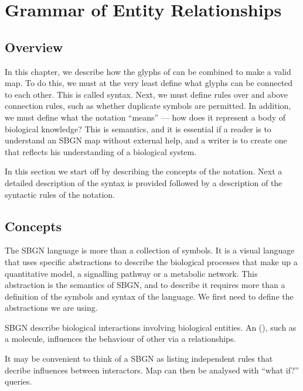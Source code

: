 \chapter{Grammar of Entity Relationships}
\label{chp:grammar}

\section{Overview}

In this chapter, we describe how the glyphs of \SBGNERLone can be combined
to make a valid \ER{} map. To do this, we must at the very least
define what glyphs can be connected to each other. This is called
syntax. Next, we must define rules over and above connection rules,
such as whether duplicate symbols are permitted. In addition, we must define what the notation ``means'' --- how does it represent a body of biological knowledge? This is semantics, and it is essential if a reader is to understand an SBGN map without external help, and a writer is to create one that reflects his understanding of a biological system.

In this section we start off by describing the concepts of the
\ER{} notation. Next a detailed description of the syntax is provided
followed by a description of the syntactic rules of the notation.

\section{Concepts}

The SBGN \ER{} language is more than a collection of symbols. It is a
visual language that uses specific abstractions to describe the
biological processes that make up a quantitative model, a signalling pathway or a metabolic network. This abstraction is the semantics of SBGN, and to describe it requires more than a definition
of the symbols and syntax of the language. We first need to define the
abstractions we are using.

SBGN \ERs{} describe biological interactions involving biological entities. An  (), such as a molecule, influences the behaviour of other  via a relationships. 

It may be convenient to think of a SBGN \ERs{} as listing independent rules that decribe influences between interactors. Map can then be analysed with ``what if?'' queries. 





